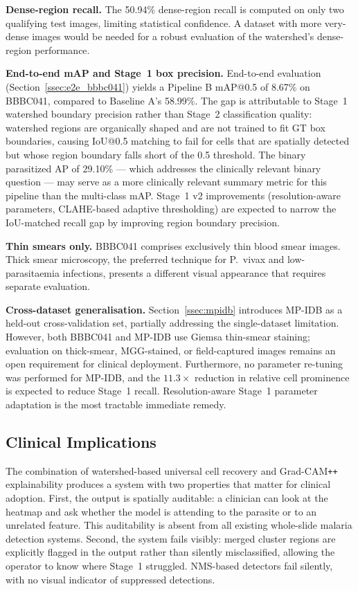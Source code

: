 \documentclass[review,12pt]{elsarticle}
\begin{document}
\textbf{Dense-region recall.} The 50.94\% dense-region recall is
computed on only two qualifying test images, limiting statistical
confidence. A dataset with more very-dense images would be needed for
a robust evaluation of the watershed's dense-region performance.

\textbf{End-to-end mAP and Stage~1 box precision.}
End-to-end evaluation (Section~\ref{ssec:e2e_bbbc041}) yields a Pipeline B
mAP@0.5 of 8.67\% on BBBC041, compared to Baseline A's 58.99\%. The gap
is attributable to Stage~1 watershed boundary precision rather than Stage~2
classification quality: watershed regions are organically shaped and are not
trained to fit GT box boundaries, causing IoU@0.5 matching to fail for cells
that are spatially detected but whose region boundary falls short of the 0.5
threshold. The binary parasitized AP of 29.10\% --- which addresses the
clinically relevant binary question --- may serve as a more clinically
relevant summary metric for this pipeline than the multi-class mAP. Stage~1 v2 improvements (resolution-aware parameters,
CLAHE-based adaptive thresholding) are expected to narrow the IoU-matched
recall gap by improving region boundary precision.

\textbf{Thin smears only.} BBBC041 comprises exclusively thin blood smear
images. Thick smear microscopy, the preferred technique for P.\ vivax and
low-parasitaemia infections, presents a different visual appearance that
requires separate evaluation.


\textbf{Cross-dataset generalisation.}
Section~\ref{ssec:mpidb} introduces MP-IDB as a held-out cross-validation
set, partially addressing the single-dataset limitation.
However, both BBBC041 and MP-IDB use Giemsa thin-smear staining; evaluation
on thick-smear, MGG-stained, or field-captured images remains an open
requirement for clinical deployment. Furthermore, no parameter re-tuning
was performed for MP-IDB, and the $11.3\times$ reduction in relative cell
prominence is expected to reduce Stage~1 recall. Resolution-aware
Stage~1 parameter adaptation is the most tractable immediate remedy.

\subsection{Clinical Implications}
\label{ssec:clinical}

The combination of watershed-based universal cell recovery and
Grad-CAM\texttt{++} explainability produces a system with two properties
that matter for clinical adoption. First, the output is spatially auditable:
a clinician can look at the heatmap and ask whether the model is attending
to the parasite or to an unrelated feature. This auditability is absent
from all existing whole-slide malaria detection systems. Second, the system
fails visibly: merged cluster regions are explicitly flagged in the output
rather than silently misclassified, allowing the operator to know where
Stage~1 struggled. NMS-based detectors fail silently, with no visual
indicator of suppressed detections.
\end{document}

